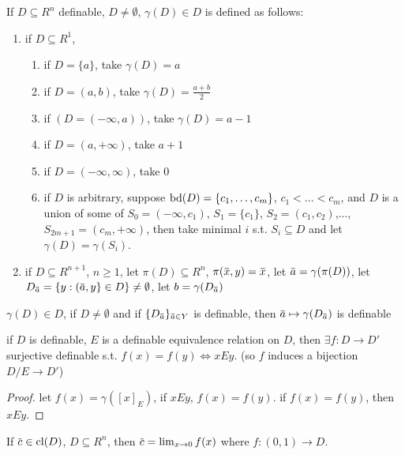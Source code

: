 \documentclass[11pt]{article}
\begin{document}
\begin{definition}[]
If \(D\subseteq R^n\) definable, \(D\neq\emptyset\), \(\gamma(D)\in D\) is defined as follows:
\begin{enumerate}
\item if \(D\subseteq R^1\),
\begin{enumerate}
\item if \(D=\{a\}\), take \(\gamma(D)=a\)
\item if \(D=(a,b)\), take \(\gamma(D)=\frac{a+b}{2}\)
\item if \((D=(-\infty,a))\), take \(\gamma(D)=a-1\)
\item if \(D=(a,+\infty)\), take \(a+1\)
\item if \(D=(-\infty,\infty)\), take \(0\)
\item if \(D\) is arbitrary, suppose \(\operatorname{bd}(D)=\{c_1,\dots,c_m\}\), \(c_1<\dots<c_m\), and \(D\) is a union
of some of \(S_0=(-\infty,c_1)\), \(S_1=\{c_1\}\), \(S_2=(c_1,c_2)\),\(\dots\), \(S_{2m+1}=(c_m,+\infty)\), then
take minimal \(i\) s.t. \(S_i\subseteq D\) and let \(\gamma(D)=\gamma(S_i)\).
\end{enumerate}
\item if \(D\subseteq R^{n+1}\), \(n\ge 1\), let \(\pi(D)\subseteq R^n\), \(\pi(\barx,y)=\barx\), let \(\bara=\gamma(\pi(D))\),
let \(D_{\bara}=\{y:(\bara,y\}\in D\}\neq\emptyset\), let \(b=\gamma(D_{\bara})\)
\end{enumerate}
\end{definition}

\begin{theorem}[]
\(\gamma(D)\in D\), if \(D\neq\emptyset\) and if \(\{D_{\bara}\}_{\bara\in Y}\) is definable,
then \(\bara\mapsto\gamma(D_{\bara})\) is definable
\end{theorem}

\begin{theorem}[]
if \(D\) is definable, \(E\) is a definable equivalence relation on \(D\), then \(\exists f:D\to D'\) surjective
definable s.t. \(f(x)=f(y)\Leftrightarrow xEy\). (so \(f\) induces a bijection \(D/E\to D'\))
\end{theorem}

\begin{proof}
let \(f(x)=\gamma([x]_E)\), if \(xEy\), \(f(x)=f(y)\). if \(f(x)=f(y)\), then \(xEy\).
\end{proof}

\begin{theorem}[]
If \(\barc\in\cl(D)\), \(D\subseteq R^n\), then \(\barc=\lim_{x\to 0}f(x)\) where \(f:(0,1)\to D\).
\end{theorem}
\end{document}
